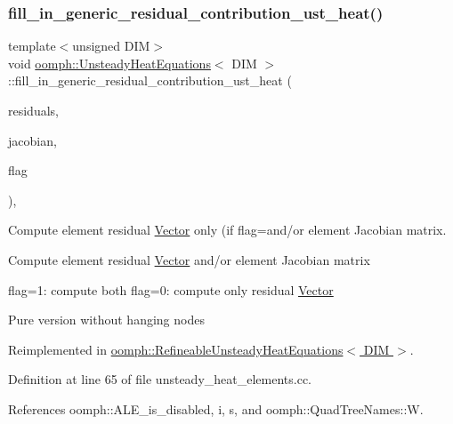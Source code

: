\subsubsection{\texorpdfstring{fill\+\_\+in\+\_\+generic\+\_\+residual\+\_\+contribution\+\_\+ust\+\_\+heat()}{fill\_in\_generic\_residual\_contribution\_ust\_heat()}}
{\footnotesize\ttfamily template$<$unsigned D\+IM$>$ \\
void \hyperlink{classoomph_1_1UnsteadyHeatEquations}{oomph\+::\+Unsteady\+Heat\+Equations}$<$ D\+IM $>$\+::fill\+\_\+in\+\_\+generic\+\_\+residual\+\_\+contribution\+\_\+ust\+\_\+heat (\begin{DoxyParamCaption}\item[{\hyperlink{classoomph_1_1Vector}{Vector}$<$ double $>$ \&}]{residuals,  }\item[{\hyperlink{classoomph_1_1DenseMatrix}{Dense\+Matrix}$<$ double $>$ \&}]{jacobian,  }\item[{unsigned}]{flag }\end{DoxyParamCaption})\hspace{0.3cm}{\ttfamily [protected]}, {\ttfamily [virtual]}}



Compute element residual \hyperlink{classoomph_1_1Vector}{Vector} only (if flag=and/or element Jacobian matrix. 

Compute element residual \hyperlink{classoomph_1_1Vector}{Vector} and/or element Jacobian matrix

flag=1\+: compute both flag=0\+: compute only residual \hyperlink{classoomph_1_1Vector}{Vector}

Pure version without hanging nodes 

Reimplemented in \hyperlink{classoomph_1_1RefineableUnsteadyHeatEquations_a06043cae80b1b6091b5914f41ffba16e}{oomph\+::\+Refineable\+Unsteady\+Heat\+Equations$<$ D\+I\+M $>$}.



Definition at line 65 of file unsteady\+\_\+heat\+\_\+elements.\+cc.



References oomph\+::\+A\+L\+E\+\_\+is\+\_\+disabled, i, s, and oomph\+::\+Quad\+Tree\+Names\+::W.

\mbox{\label{classoomph_1_1UnsteadyHeatEquations_a16a237c1055f7d8f577eab77ca00a03c}} 
